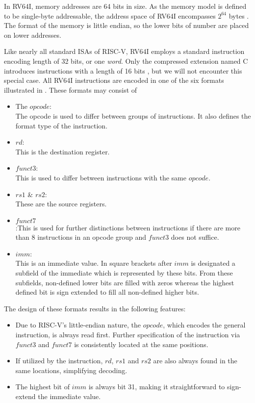 In RV64I, memory addresses are 64 bits in size. As the memory model
is defined to be single-byte addressable, the address space of RV64I
encompasses $2^{64}$ bytes \cite[Chapter 1.4]{riscv-isa}. The format
of the memory is little endian, so the lower bits of number are
placed on lower addresses.

Like nearly all standard ISAs of RISC-V, RV64I employs a standard
instruction encoding length of 32 bits, or one \emph{word}. Only the
compressed extension named C introduces instructions with a length of
16 bits \cite[Chapter 1.5]{riscv-isa}, but we will not encounter this
special case. All RV64I instructions are encoded in one of the six
formats illustrated in . These formats may
consist of
\begin{itemize}
      \item The $opcode$:\\ The opcode is used to differ between groups of
            instructions. It also defines the format type of the instruction.
      \item $rd$:\\ This is the destination register.
      \item $funct3$:\\This is used to differ between instructions with the same
            $opcode$.
      \item $rs1$ \& $rs2$:\\ These are the source registers.
      \item $funct7$\\:This is used for further distinctions between instructions
            if there are more than 8 instructions in an opcode group and $funct3$
            does not suffice.
      \item $imm$:\\This is an immediate value. In square brackets after $imm$ is
            designated a subfield of the immediate which is represented by these
            bits. From these subfields, non-defined lower bits are filled with
            zeros whereas the highest defined bit is sign extended to fill all
            non-defined higher bits.
\end{itemize}



The design of these formats results in the following features:
\begin{itemize}
      \item Due to RISC-V's little-endian nature, the $opcode$, which encodes the
            general instruction, is always read first. Further specification of
            the instruction via $funct3$ and $funct7$ is consistently located at
            the same positions.
      \item If utilized by the instruction, $rd$, $rs1$ and $rs2$ are also always
            found in the same locations, simplifying decoding.
      \item The highest bit of $imm$ is always bit 31, making it straightforward
            to sign-extend the immediate value.
\end{itemize}

